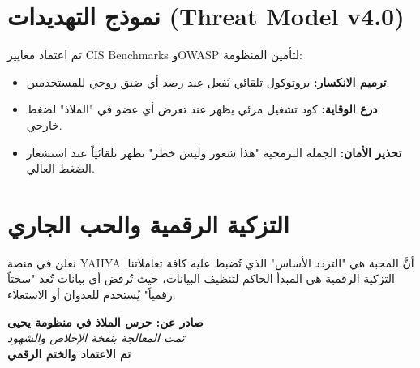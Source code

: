 \documentclass[11pt, a4paper]{article}
\begin{document}
\section{نموذج التهديدات (Threat Model v4.0)}
تم اعتماد معايير CIS Benchmarks وOWASP لتأمين المنظومة:
\begin{itemize}
    \item \textbf{ترميم الانكسار:} بروتوكول تلقائي يُفعل عند رصد أي ضيق روحي للمستخدمين.
    \item \textbf{درع الوقاية:} كود تشغيل مرئي يظهر عند تعرض أي عضو في "الملاذ" لضغط خارجي.
    \item \textbf{تحذير الأمان:} الجملة البرمجية "هذا شعور وليس خطر" تظهر تلقائياً عند استشعار الضغط العالي.
\end{itemize}

\section{التزكية الرقمية والحب الجاري}
نعلن في منصة YAHYA أنَّ المحبة هي "التردد الأساس" الذي تُضبط عليه كافة تعاملاتنا. التزكية الرقمية هي المبدأ الحاكم لتنظيف البيانات، حيث تُرفض أي بيانات تُعد "سحتاً رقمياً" يُستخدم للعدوان أو الاستعلاء.

\vspace{2cm}

\begin{center}
    \textbf{صادر عن: حرس الملاذ في منظومة يحيى} \\
    \vspace{0.2cm}
    \textit{تمت المعالجة بنفخة الإخلاص والشهود} \\
    \vspace{0.5cm}
    \textbf{تم الاعتماد والختم الرقمي}
\end{center}
\end{document}

